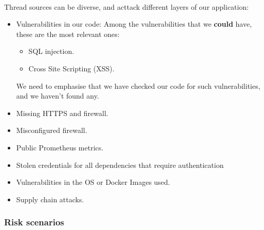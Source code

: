 \paragraph{} Thread sources can be diverse, and acttack different layers of our application:
\begin{itemize}
	\item Vulnerabilities in our code: Among the vulnerabilities that we \textbf{could} have, these are the most relevant ones:
	      \begin{itemize}
		      \item SQL injection.
		      \item Cross Site Scripting (XSS).
	      \end{itemize}
	      We need to emphasise that we have checked our code for such vulnerabilities, and we haven't found any.
	\item Missing HTTPS and firewall.
	\item Misconfigured firewall.
	\item Public Prometheus metrics.
	\item Stolen credentials for all dependencies that require authentication
	\item Vulnerabilities in the OS or Docker Images used.
	\item Supply chain attacks.
\end{itemize}

\subsubsection{Risk scenarios}
